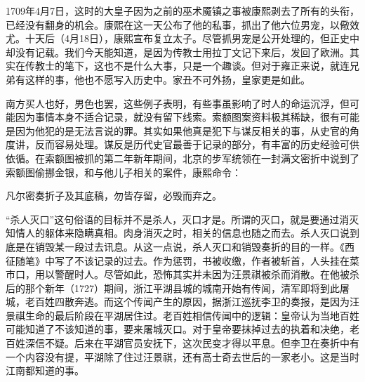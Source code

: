 
1709年4月7日，这时的大皇子因为之前的巫术魇镇之事被康熙剥去了所有的头衔，已经没有翻身的机会。康熙在这一天公布了他的私事，抓出了他六位男宠，以儆效尤。十天后（4月18日），康熙宣布复立太子。尽管抓男宠是公开处理的，但正史中却没有记载。我们今天能知道，是因为传教士用拉丁文记下来后，发回了欧洲。其实在传教士的笔下，这也不是什么大事，只是一个趣谈。但对于雍正来说，就连兄弟有这样的事，他也不愿写入历史中。家丑不可外扬，皇家更是如此。



南方买人也好，男色也罢，这些例子表明，有些事虽影响了时人的命运沉浮，但可能因为事情本身不适合记录，就没有留下线索。索额图案资料极其稀缺，很有可能是因为他犯的是无法言说的罪。其实如果他真是犯下与谋反相关的事，从史官的角度讲，反而容易处理。谋反是历代史官最善于记录的部分，有丰富的历史经验可供依循。在索额图被抓的第二年新年期间，北京的步军统领在一封满文密折中说到了索额图偷挪金银，和与他儿子相关的案件，康熙命令：



\begin{bookquote}凡尔密奏折子及其底稿，勿皆存留，必毁而弃之。\end{bookquote}


“杀人灭口”这句俗语的目标并不是杀人，灭口才是。所谓的灭口，就是要通过消灭知情人的躯体来隐瞒真相。肉身消灭之时，相关的信息也随之而去。杀人灭口说到底是在销毁某一段过去讯息。从这一点说，杀人灭口和销毁奏折的目的一样。《西征随笔》中写了不该记录的过去。作为惩罚，书被收缴，作者被斩首，人头挂在菜市口，用以警醒时人。尽管如此，恐怖其实并未因为汪景祺被杀而消散。在他被杀后的那个新年（1727）期间，浙江平湖县城的城南开始有传闻，清军即将到此屠城，老百姓四散奔逃。而这个传闻产生的原因，据浙江巡抚李卫的奏报，是因为汪景祺生命的最后阶段在平湖居住过。老百姓相信传闻中的逻辑：皇帝认为当地百姓可能知道了不该知道的事，要来屠城灭口。对于皇帝要抹掉过去的执着和决绝，老百姓深信不疑。后来在平湖官员安抚下，这次民变才得以平息。但李卫在奏折中有一个内容没有提，平湖除了住过汪景祺，还有高士奇去世后的一家老小。这是当时江南都知道的事。


